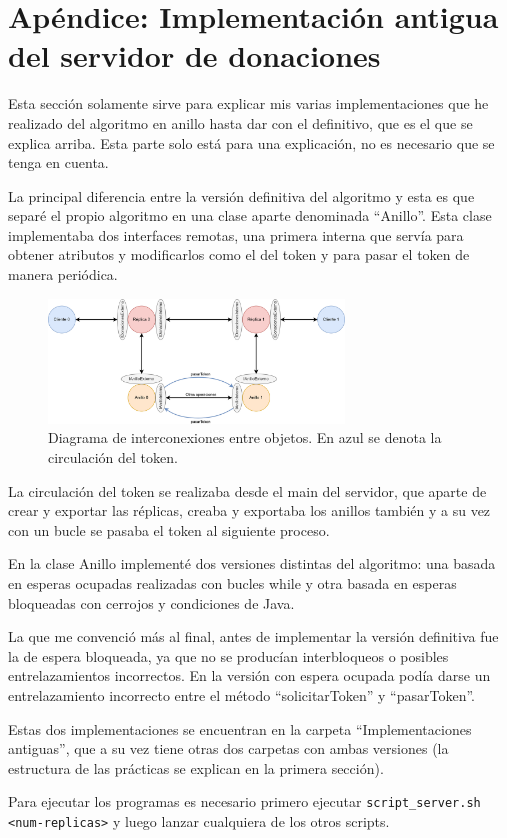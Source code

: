 \documentclass{article}
\begin{document}
\newpage

\section{Apéndice: Implementación antigua del servidor de donaciones}
Esta sección solamente sirve para explicar mis varias implementaciones que he realizado del algoritmo en anillo hasta dar con el definitivo, que es el que se explica arriba. Esta parte solo está para una explicación, no es necesario que se tenga en cuenta.

\bigskip

La principal diferencia entre la versión definitiva del algoritmo y esta es que separé el propio algoritmo en una clase aparte denominada ``Anillo''. Esta clase implementaba dos interfaces remotas, una primera interna que servía para obtener atributos y modificarlos como el del token y para pasar el token de manera periódica.

\begin{figure}[H]
    \centering
    \includegraphics[width=0.7\textwidth]{imagenes/diagramaAnillosSeparados.png}
    \caption{Diagrama de interconexiones entre objetos. En azul se denota la circulación del token.}
\end{figure}

La circulación del token se realizaba desde el main del servidor, que aparte de crear y exportar las réplicas, creaba y exportaba los anillos también y a su vez con un bucle se pasaba el token al siguiente proceso.

\bigskip

En la clase Anillo implementé dos versiones distintas del algoritmo: una basada en esperas ocupadas realizadas con bucles while y otra basada en esperas bloqueadas con cerrojos y condiciones de Java.

\bigskip

La que me convenció más al final, antes de implementar la versión definitiva fue la de espera bloqueada, ya que no se producían interbloqueos o posibles entrelazamientos incorrectos. En la versión con espera ocupada podía darse un entrelazamiento incorrecto entre el método ``solicitarToken'' y ``pasarToken''.

Estas dos implementaciones se encuentran en la carpeta ``Implementaciones antiguas'', que a su vez tiene otras dos carpetas con ambas versiones (la estructura de las prácticas se explican en la primera sección).

\bigskip

Para ejecutar los programas es necesario primero ejecutar \verb|script_server.sh <num-replicas>| y luego lanzar cualquiera de los otros scripts.
\end{document}
